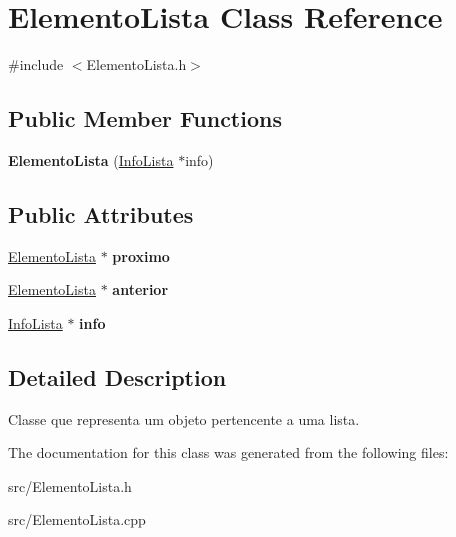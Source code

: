 \hypertarget{classElementoLista}{\section{\-Elemento\-Lista \-Class \-Reference}
\label{classElementoLista}
}


{\ttfamily \#include $<$\-Elemento\-Lista.\-h$>$}

\subsection*{\-Public \-Member \-Functions}
\begin{DoxyCompactItemize}
\item 
\hypertarget{classElementoLista_afc0a137f6531eda04f431d90b781f398}{{\bfseries \-Elemento\-Lista} (\hyperlink{classInfoLista}{\-Info\-Lista} $\ast$info)}\label{classElementoLista_afc0a137f6531eda04f431d90b781f398}

\end{DoxyCompactItemize}
\subsection*{\-Public \-Attributes}
\begin{DoxyCompactItemize}
\item 
\hypertarget{classElementoLista_a270503397f15aa4b4a49f6888780d423}{\hyperlink{classElementoLista}{\-Elemento\-Lista} $\ast$ {\bfseries proximo}}\label{classElementoLista_a270503397f15aa4b4a49f6888780d423}

\item 
\hypertarget{classElementoLista_a708cad44576ffce6a231a62aa949772a}{\hyperlink{classElementoLista}{\-Elemento\-Lista} $\ast$ {\bfseries anterior}}\label{classElementoLista_a708cad44576ffce6a231a62aa949772a}

\item 
\hypertarget{classElementoLista_ae9e110ab1ff4a52d85826d892dd49cc4}{\hyperlink{classInfoLista}{\-Info\-Lista} $\ast$ {\bfseries info}}\label{classElementoLista_ae9e110ab1ff4a52d85826d892dd49cc4}

\end{DoxyCompactItemize}


\subsection{\-Detailed \-Description}
\-Classe que representa um objeto pertencente a uma lista. 

\-The documentation for this class was generated from the following files\-:\begin{DoxyCompactItemize}
\item 
src/\-Elemento\-Lista.\-h\item 
src/\-Elemento\-Lista.\-cpp\end{DoxyCompactItemize}
